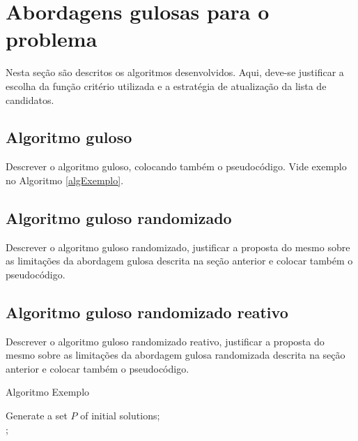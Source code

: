 \documentclass[12pt,fleqn]{article}
\begin{document}
\section{Abordagens gulosas para o problema}
\label{secAlgoritmos}
Nesta seção são descritos os algoritmos desenvolvidos. Aqui, deve-se justificar a escolha da função critério utilizada e a estratégia de atualização da lista de candidatos.

\subsection{Algoritmo guloso}
\label{subSecAlgGulo}

Descrever o algoritmo guloso, colocando também o pseudocódigo. Vide exemplo no Algoritmo \ref{algExemplo}.


\subsection{Algoritmo guloso randomizado}
\label{subSecAlgRand}

Descrever o algoritmo guloso randomizado, justificar a proposta do mesmo sobre as limitações da abordagem gulosa descrita na seção anterior e colocar também o pseudocódigo.


\subsection{Algoritmo guloso randomizado reativo}
\label{subSecAlgRandReact}
Descrever o algoritmo guloso randomizado reativo, justificar a proposta do mesmo sobre as limitações da abordagem gulosa randomizada descrita na seção anterior e colocar também o pseudocódigo.

\begin{algorithm}[!htb]
  \SetAlgoLined
  \caption{Algoritmo Exemplo}\label{alg.PPA}
  \label{algExemplo}
  Generate a set $P$ of initial solutions; \\
  
    ; \\
\end{algorithm}
\end{document}

